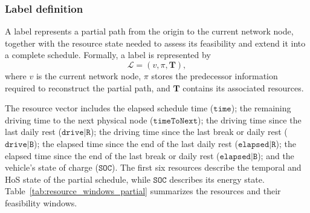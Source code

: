 \documentclass[3p,11pt,authoryear]{elsarticle}  %
\begin{document}
\subsubsection{Label definition}


A label represents a partial path from the origin to the current network node, together with the resource state needed to assess its feasibility and extend it into a complete schedule. Formally, a label is represented by
\[
\mathcal{L}=(v,\pi,\mathbf{T}),
\]
where \(v\) is the current network node, \(\pi\) stores the predecessor information required to reconstruct the partial path, and \(\mathbf{T}\) contains its associated resources.

The resource vector includes the elapsed schedule time (\(\texttt{time}\)); the remaining driving time to the next physical node (\(\texttt{timeToNext}\)); the driving time since the last daily rest (\(\texttt{drive|R}\)); the driving time since the last break or daily rest (\(\texttt{drive|B}\)); the elapsed time since the end of the last daily rest (\(\texttt{elapsed|R}\)); the elapsed time since the end of the last break or daily rest (\(\texttt{elapsed|B}\)); and the vehicle's state of charge (\(\texttt{SOC}\)). The first six resources describe the temporal and HoS state of the partial schedule, while \(\texttt{SOC}\) describes its energy state.
Table~\ref{tab:resource_windows_partial} summarizes the resources and their feasibility windows.



\end{document}
